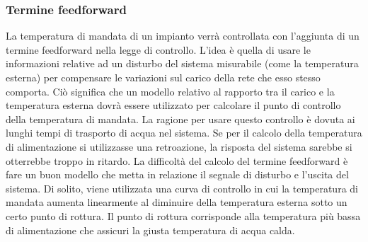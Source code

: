 \documentclass[laurea,oneside,11pt]{USiena_tesiLM}
\begin{document}
\subsubsection{Termine feedforward}
La temperatura di mandata di un impianto verrà controllata con l'aggiunta di un termine feedforward nella legge di controllo. L'idea è quella di usare le informazioni relative ad un disturbo del sistema misurabile (come la temperatura esterna) per compensare le variazioni sul carico della rete che esso stesso comporta. Ciò significa che un modello relativo al rapporto tra il carico e la temperatura esterna dovrà essere utilizzato per calcolare il punto di controllo della temperatura di mandata.
La ragione per usare questo controllo è dovuta ai lunghi tempi di trasporto di acqua nel sistema. Se per il calcolo della temperatura di alimentazione si utilizzasse una retroazione, la risposta del sistema sarebbe si otterrebbe troppo in ritardo.
La difficoltà del calcolo del termine feedforward è fare un buon modello che metta in relazione  il segnale di disturbo e l'uscita del sistema. Di solito, viene utilizzata una curva di controllo in cui la temperatura di mandata aumenta linearmente al diminuire della temperatura esterna sotto un certo punto di rottura. Il punto di rottura corrisponde alla temperatura più bassa di alimentazione che assicuri la giusta temperatura di acqua calda. 
\end{document}
